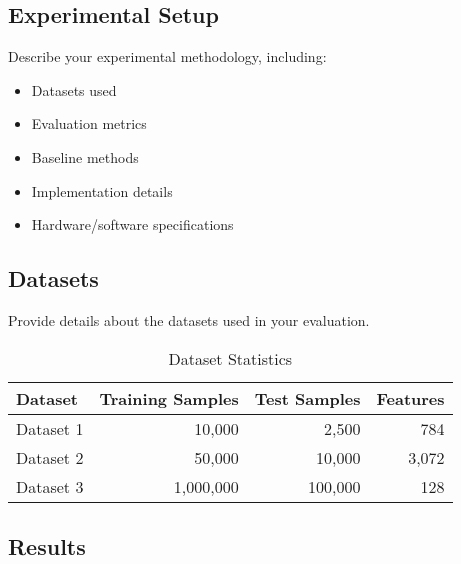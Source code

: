 \documentclass[11pt,a4paper]{article}
\begin{document}

\subsection{Experimental Setup}
\label{subsec:setup}

Describe your experimental methodology, including:
\begin{itemize}
    \item Datasets used
    \item Evaluation metrics
    \item Baseline methods
    \item Implementation details
    \item Hardware/software specifications
\end{itemize}

\subsection{Datasets}
\label{subsec:datasets}

Provide details about the datasets used in your evaluation.

\begin{table}[htbp]
\centering
\caption{Dataset Statistics}
\label{tab:datasets}
\begin{tabular}{@{}lrrr@{}}
\toprule
Dataset & Training Samples & Test Samples & Features \\
\midrule
Dataset 1 & 10,000 & 2,500 & 784 \\
Dataset 2 & 50,000 & 10,000 & 3,072 \\
Dataset 3 & 1,000,000 & 100,000 & 128 \\
\bottomrule
\end{tabular}
\end{table}

\subsection{Results}
\label{subsec:results}

\end{document}
